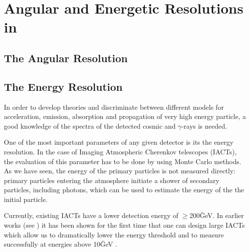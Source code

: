 

\def\SIZE{\mbox{\scshape size}\xspace}
\def\LENGTH{\mbox{\scshape length}\xspace}
\def\WIDTH{\mbox{\scshape width}\xspace}
\def\DISTANCE{\mbox{\scshape distance}\xspace}

\chapter{Angular and Energetic Resolutions in \MAGIC}
\label{chapter:resol}

\section{The Angular Resolution}

\section{The Energy Resolution}

In order to develop theories and discriminate between different models
for acceleration, emission, absorption and propagation of very high
energy particle, a good knowledge of the spectra of the detected
cosmic and $\gamma$-rays is needed.

One of the most important parameters of any given detector is its the
energy resolution.  In the case of Imaging Atmospheric Cherenkov
telescopes (IACTs), the evaluation of this parameter has to be done by
using Monte Carlo methods.  As we have seen, the energy of the primary
particles is not measured directly: primary particles entering the
atmosphere initiate a shower of secondary particles, including
\Cherenkov photons, which can be used to estimate the energy of the
the initial particle.

Currently, existing IACTs have a lower detection energy of
$\geq$200\u{GeV}.  In earlier works (see \cite{MAGIC:Gonzalez_Kruger})
it has been shown for the first time that one can design large IACTs
which allow us to dramatically lower the energy threshold and to
measure successfully at energies above 10\u{GeV} \cite{MAGIC:DR}.

